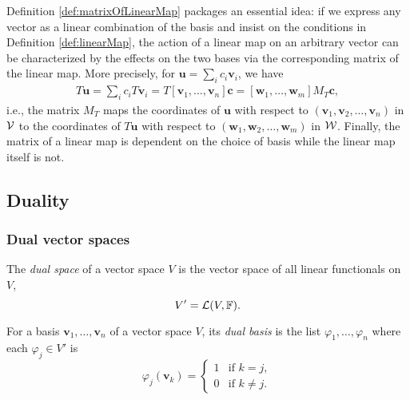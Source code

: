 \begin{rem}
  Definition \ref{def:matrixOfLinearMap} 
  packages an essential idea:
  if we express any vector as a linear combination
  of the basis
  and insist on the conditions in Definition \ref{def:linearMap},
  the action of a linear map on an arbitrary vector 
  can be characterized by the effects on the two bases
  via the corresponding matrix of the linear map.
  More precisely,
  for $\mathbf{u}=\sum_i c_i\mathbf{v}_i$,
  we have 
  \begin{align*}
    T\mathbf{u} = \sum_i c_iT\mathbf{v}_i = T [\mathbf{v}_1, \ldots, \mathbf{v}_n] \mathbf{c}
    = [\mathbf{w}_1, \ldots, \mathbf{w}_m] M_T \mathbf{c}, 
  \end{align*}
  i.e., the matrix $M_T$ maps the coordinates of $\mathbf{u}$
  with respect to  $(\mathbf{v}_1, \mathbf{v}_2, \ldots, \mathbf{v}_n)$
  in ${\cal V}$
  to the coordinates of $T\mathbf{u}$
  with respect to $(\mathbf{w}_1, \mathbf{w}_2, \ldots, \mathbf{w}_m)$
  in ${\cal W}$.
  Finally, the matrix of a linear map is dependent on
  the choice of basis while the linear map itself is not.
\end{rem}


\subsection{Duality}
\label{sec:duality}

\subsubsection{Dual vector spaces}
\label{sec:dual-space}

\begin{defn}
  \label{def:dualSpace}
  The \emph{dual space} of a vector space $V$
   is the vector space of all linear functionals on $V$,
   \begin{equation}
     \label{eq:dualSpace}
     V'={\cal L}(V,\mathbb{F}).
   \end{equation}
\end{defn}

\begin{defn}
  \label{def:dualBasis}
  For a basis $\mathbf{v}_1,\ldots, \mathbf{v}_n$ of a vector space $V$,
   its \emph{dual basis}
   is the list $\varphi_1, \ldots, \varphi_n$
   where each $\varphi_j\in V'$ is
   \begin{equation}
     \label{eq:dualBasis}
     \varphi_j(\mathbf{v}_k) = 
     \begin{cases}
       1 & \textrm{if } k=j,
       \\
       0 & \textrm{if } k\ne j.
     \end{cases}
   \end{equation}
\end{defn}

